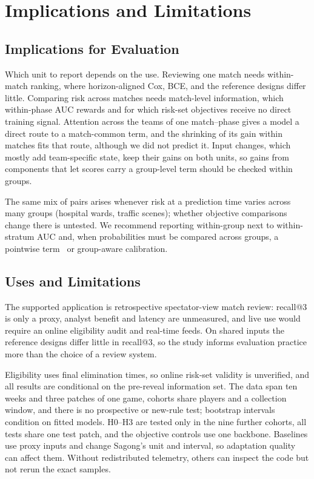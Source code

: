 \documentclass[sigconf,anonymous]{acmart}
\begin{document}
\section{Implications and Limitations}
\label{sec:discussion}
\subsection{Implications for Evaluation}
\label{sec:discussion:implications}
Which unit to report depends on the use. Reviewing one match needs within-match ranking, where horizon-aligned Cox, BCE, and the reference designs differ little. Comparing risk across matches needs match-level information, which within-phase AUC rewards and for which risk-set objectives receive no direct training signal. Attention across the teams of one match--phase gives a model a direct route to a match-common term, and the shrinking of its gain within matches fits that route, although we did not predict it. Input changes, which mostly add team-specific state, keep their gains on both units, so gains from components that let scores carry a group-level term should be checked within groups.

The same mix of pairs arises whenever risk at a prediction time varies across many groups (hospital wards, traffic scenes); whether objective comparisons change there is untested. We recommend reporting within-group next to within-stratum AUC and, when probabilities must be compared across groups, a pointwise term~\cite{Bai23} or group-aware calibration.

\subsection{Uses and Limitations}
\label{sec:discussion:limits}
The supported application is retrospective spectator-view match review: recall@3 is only a proxy, analyst benefit and latency are unmeasured, and live use would require an online eligibility audit and real-time feeds. On shared inputs the reference designs differ little in recall@3, so the study informs evaluation practice more than the choice of a review system.

Eligibility uses final elimination times, so online risk-set validity is unverified, and all results are conditional on the pre-reveal information set. The data span ten weeks and three patches of one game, cohorts share players and a collection window, and there is no prospective or new-rule test; bootstrap intervals condition on fitted models. H0--H3 are tested only in the nine further cohorts, all tests share one test patch, and the objective controls use one backbone. Baselines use proxy inputs and change Sagong's unit and interval, so adaptation quality can affect them. Without redistributed telemetry, others can inspect the code but not rerun the exact samples.
\end{document}

